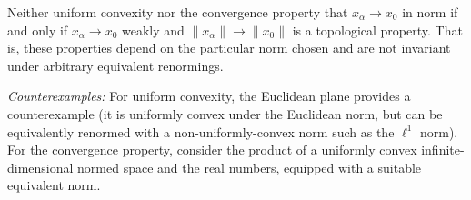 Neither uniform convexity nor the convergence property that $x_\alpha \to x_0$ in norm if and only if $x_\alpha \to x_0$ weakly and $\|x_\alpha\| \to \|x_0\|$ is a topological property. That is, these properties depend on the particular norm chosen and are not invariant under arbitrary equivalent renormings.

\textit{Counterexamples:} For uniform convexity, the Euclidean plane provides a counterexample (it is uniformly convex under the Euclidean norm, but can be equivalently renormed with a non-uniformly-convex norm such as the $\ell^1$ norm). For the convergence property, consider the product of a uniformly convex infinite-dimensional normed space and the real numbers, equipped with a suitable equivalent norm.
